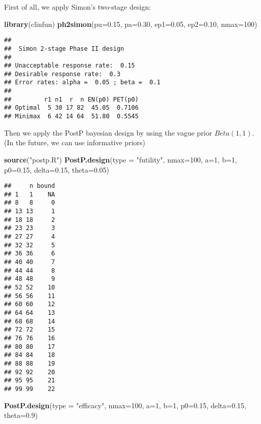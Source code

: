 \documentclass[]{article}
\newenvironment{Shaded}{\begin{snugshade}}{\end{snugshade}}
\newcommand{\KeywordTok}[1]{\textcolor[rgb]{0.13,0.29,0.53}{\textbf{{#1}}}}
\newcommand{\DataTypeTok}[1]{\textcolor[rgb]{0.13,0.29,0.53}{{#1}}}
\newcommand{\DecValTok}[1]{\textcolor[rgb]{0.00,0.00,0.81}{{#1}}}
\newcommand{\FloatTok}[1]{\textcolor[rgb]{0.00,0.00,0.81}{{#1}}}
\newcommand{\StringTok}[1]{\textcolor[rgb]{0.31,0.60,0.02}{{#1}}}
\newcommand{\NormalTok}[1]{{#1}}
\begin{document}
First of all, we apply Simon's two-stage design:

\begin{Shaded}
\begin{Highlighting}[]
\KeywordTok{library}\NormalTok{(clinfun)}
\KeywordTok{ph2simon}\NormalTok{(}\DataTypeTok{pu=}\FloatTok{0.15}\NormalTok{, }\DataTypeTok{pa=}\FloatTok{0.30}\NormalTok{, }\DataTypeTok{ep1=}\FloatTok{0.05}\NormalTok{, }\DataTypeTok{ep2=}\FloatTok{0.10}\NormalTok{, }\DataTypeTok{nmax=}\DecValTok{100}\NormalTok{)}
\end{Highlighting}
\end{Shaded}

\begin{verbatim}
## 
##  Simon 2-stage Phase II design 
## 
## Unacceptable response rate:  0.15 
## Desirable response rate:  0.3 
## Error rates: alpha =  0.05 ; beta =  0.1 
## 
##         r1 n1  r  n EN(p0) PET(p0)
## Optimal  5 30 17 82  45.05  0.7106
## Minimax  6 42 14 64  51.80  0.5545
\end{verbatim}

Then we apply the PostP bayesian design by using the vague prior
\(Beta(1,1)\). (In the future, we can use informative priors)

\begin{Shaded}
\begin{Highlighting}[]
\KeywordTok{source}\NormalTok{(}\StringTok{"postp.R"}\NormalTok{)}
\KeywordTok{PostP.design}\NormalTok{(}\DataTypeTok{type =} \StringTok{"futility"}\NormalTok{, }\DataTypeTok{nmax=}\DecValTok{100}\NormalTok{, }\DataTypeTok{a=}\DecValTok{1}\NormalTok{, }\DataTypeTok{b=}\DecValTok{1}\NormalTok{, }\DataTypeTok{p0=}\FloatTok{0.15}\NormalTok{, }\DataTypeTok{delta=}\FloatTok{0.15}\NormalTok{, }\DataTypeTok{theta=}\FloatTok{0.05}\NormalTok{)}
\end{Highlighting}
\end{Shaded}

\begin{verbatim}
##     n bound
## 1   1    NA
## 8   8     0
## 13 13     1
## 18 18     2
## 23 23     3
## 27 27     4
## 32 32     5
## 36 36     6
## 40 40     7
## 44 44     8
## 48 48     9
## 52 52    10
## 56 56    11
## 60 60    12
## 64 64    13
## 68 68    14
## 72 72    15
## 76 76    16
## 80 80    17
## 84 84    18
## 88 88    19
## 92 92    20
## 95 95    21
## 99 99    22
\end{verbatim}

\begin{Shaded}
\begin{Highlighting}[]
\KeywordTok{PostP.design}\NormalTok{(}\DataTypeTok{type =} \StringTok{"efficacy"}\NormalTok{, }\DataTypeTok{nmax=}\DecValTok{100}\NormalTok{, }\DataTypeTok{a=}\DecValTok{1}\NormalTok{, }\DataTypeTok{b=}\DecValTok{1}\NormalTok{, }\DataTypeTok{p0=}\FloatTok{0.15}\NormalTok{, }\DataTypeTok{delta=}\FloatTok{0.15}\NormalTok{, }\DataTypeTok{theta=}\FloatTok{0.9}\NormalTok{)}
\end{Highlighting}
\end{Shaded}
\end{document}
